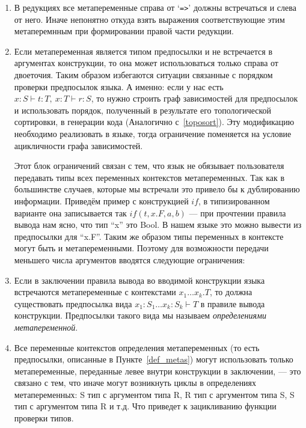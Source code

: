 \begin{enumerate}
\item В редукциях все метапеременные справа от `\lstinline{=>}' должны встречаться и слева от него. Иначе непонятно откуда взять выражения соответствующие этим метаперемнным при формировании правой части редукции.

\item \label{right::} Если метапеременная является типом предпосылки и не встречается в аргументах конструкции, то она может использоваться только справа от двоеточия. Таким образом избегаются ситуации связанные с порядком проверки предпосылок языка. А именно: если у нас есть $x : S \vdash t : T,\ x:T \vdash r : S$, то нужно строить граф зависимостей для предпосылок и использовать порядок, полученный в результате его топологической сортировки, в генерации кода (Аналогично с~\ref{toposort}). Эту модификацию необходимо реализовать в языке, тогда ограничение поменяется на условие ацикличности графа зависимостей.

\hfill

Этот блок ограничений связан с тем, что язык не обязывает пользователя передавать типы всех переменных контекстов метапеременных. Так как в большинстве случаев, которые мы встречали это привело бы к дублированию информации. Приведём пример с конструкцией $if$, в типизированном варианте она записывается так $if(t, x.F, a, b)$ --- при прочтении правила вывода нам ясно, что тип ``x'' это Bool. В нашем языке это можно вывести из предпосылки для ``x.F''. Таким же образом типы переменных в контексте могут быть и метапеременными. Поэтому для возможности передачи меньшего числа аргументов вводятся следующие ограничения:

\item \label{def_metas} Если в заключении правила вывода во вводимой конструкции языка встречаются метапеременные с контекстами $x_1 \ldots x_k . T$, то должна существовать предпосылка вида $x_1 : S_1 \ldots x_k : S_k  \vdash T$ в правиле вывода конструкции. Предпосылки такого вида мы называем \textit{определениями метапеременной}.

\item \label{order:Meta} Все переменные контекстов определения метапеременных (то есть предпосылки, описанные в Пункте~\ref{def_metas}) могут использовать только метапеременные, переданные левее внутри конструкции в заключении, --- это связано с тем, что иначе могут возникнуть циклы в определениях метапеременных: S тип с аргументом типа R, R тип с аргументом типа S, S тип с аргументом типа R и т.д. Что приведет к зацикливанию функции проверки типов.


\end{enumerate}
